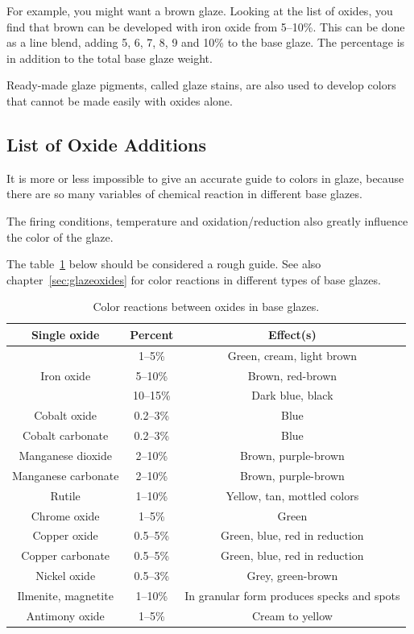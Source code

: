 For example, you might want a brown glaze. Looking at the list of oxides, you 
find that brown can be developed with iron oxide from 5--10\%. This can be done 
as a line blend, adding 5, 6, 7, 8, 9 and 10\% to the base glaze. The 
percentage is in addition to the total base glaze weight.

Ready-made glaze pigments, called glaze stains, are also used to develop colors 
that cannot be made easily with oxides alone.
\subsection{List of Oxide Additions}
It is more or less impossible to give an accurate guide to colors in glaze, 
because there are so many variables of chemical reaction in different base 
glazes.

The firing conditions, temperature and oxidation/reduction also greatly 
influence the color of the glaze.

The table~\ref{tab:oxideadditions} below should be considered a rough guide. 
See also chapter~\ref{sec:glazeoxides} for color reactions in different types 
of base glazes.
\begin{center}
  \renewcommand{\arraystretch}{1.5}
  \begin{table}\centering
    \begin{tabular}{|c|c|c|}\hline
      \textbf{Single oxide}&\textbf{Percent}&\textbf{Effect(s)}\\\hline\hline
      &1--5\%&Green, cream, light brown\\\cline{2-3}
      Iron oxide&5--10\%&Brown, red-brown\\\cline{2-3}
      &10--15\%&Dark blue, black\\\hline
      Cobalt oxide&0.2--3\%&Blue\\\hline
      Cobalt carbonate&0.2--3\%&Blue\\\hline
      Manganese dioxide&2--10\%&Brown, purple-brown\\\hline
      Manganese carbonate&2--10\%&Brown, purple-brown\\\hline
      Rutile&1--10\%&Yellow, tan, mottled colors\\\hline
      Chrome oxide&1--5\%&Green\\\hline
      Copper oxide&0.5--5\%&Green, blue, red in reduction\\\hline
      Copper carbonate&0.5--5\%&Green, blue, red in reduction\\\hline
      Nickel oxide&0.5--3\%&Grey, green-brown\\\hline
      Ilmenite, magnetite&1--10\%&In granular form produces specks and 
      spots\\\hline
      Antimony oxide&1--5\%&Cream to yellow\\\hline
    \end{tabular}
\caption{Color reactions between oxides in base glazes.}
\label{tab:oxideadditions}
  \end{table}
\end{center}
